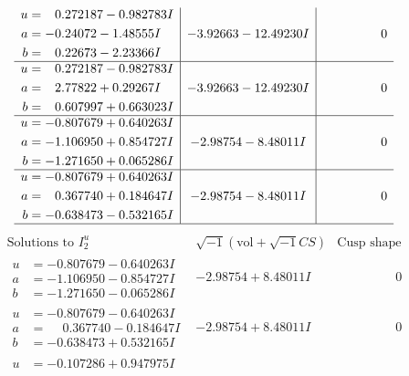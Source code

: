 \documentclass[1p]{elsarticle_modified}
\theoremstyle{definition}
\newcommand{\I}{\sqrt{-1}}
\begin{document}
$$\begin{array}{c|c|c}
\begin{aligned}
u &= \phantom{-}0.272187 - 0.982783 I \\
a &= -0.24072 - 1.48555 I \\
b &= \phantom{-}0.22673 - 2.23366 I\end{aligned}
 & -3.92663 - 12.49230 I & \phantom{-0.000000 } 0 \\ \hline\begin{aligned}
u &= \phantom{-}0.272187 - 0.982783 I \\
a &= \phantom{-}2.77822 + 0.29267 I \\
b &= \phantom{-}0.607997 + 0.663023 I\end{aligned}
 & -3.92663 - 12.49230 I & \phantom{-0.000000 } 0 \\ \hline\begin{aligned}
u &= -0.807679 + 0.640263 I \\
a &= -1.106950 + 0.854727 I \\
b &= -1.271650 + 0.065286 I\end{aligned}
 & -2.98754 - 8.48011 I & \phantom{-0.000000 } 0 \\ \hline\begin{aligned}
u &= -0.807679 + 0.640263 I \\
a &= \phantom{-}0.367740 + 0.184647 I \\
b &= -0.638473 - 0.532165 I\end{aligned}
 & -2.98754 - 8.48011 I & \phantom{-0.000000 } 0\\
 \hline 
 \end{array}$$\newpage$$\begin{array}{c|c|c}  
\text{Solutions to }I^u_{2}& \I (\text{vol} + \sqrt{-1}CS) & \text{Cusp shape}\\
 \hline 
\begin{aligned}
u &= -0.807679 - 0.640263 I \\
a &= -1.106950 - 0.854727 I \\
b &= -1.271650 - 0.065286 I\end{aligned}
 & -2.98754 + 8.48011 I & \phantom{-0.000000 } 0 \\ \hline\begin{aligned}
u &= -0.807679 - 0.640263 I \\
a &= \phantom{-}0.367740 - 0.184647 I \\
b &= -0.638473 + 0.532165 I\end{aligned}
 & -2.98754 + 8.48011 I & \phantom{-0.000000 } 0 \\ \hline\begin{aligned}
u &= -0.107286 + 0.947975 I \\

\end{aligned}
\end{array}$$
\end{document}

